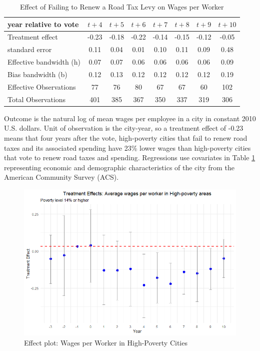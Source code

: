 \begin{table}[ht]
    \centering
    \caption{Effect of Failing to Renew a Road Tax Levy on Wages per Worker}
    \label{tab:wages_per_worker}
    \begin{tabular}{p{2.8cm}ccccccc}
        \hline
        year relative to vote & $t + 4$ & $t + 5$ & $t + 6$ & $t + 7$ & $t + 8$ & $t + 9$ & $t + 10$ \\
        \hline
        Treatment effect & -0.23 & -0.18 & -0.22 & -0.14 & -0.15 & -0.12 & -0.05 \\
        standard error & 0.11 & 0.04 & 0.01 & 0.10 & 0.11 & 0.09 & 0.48 \\
        Effective bandwidth (h) & 0.07 & 0.07 & 0.06 & 0.06 & 0.06 & 0.06 & 0.09 \\
        Bias bandwidth (b) & 0.12 & 0.13 & 0.12 & 0.12 & 0.12 & 0.12 & 0.19 \\
        Effective Observations & 77 & 76 & 80 & 67 & 67 & 60 & 102 \\
        Total Observations & 401 & 385 & 367 & 350 & 337 & 319 & 306 \\
        \hline
    \end{tabular}
    \begin{tablenotes}
        \small 
        \item Outcome is the natural log of mean wages per employee in a city in constant 2010 U.S. dollars. Unit of observation is the city-year, so a treatment effect of -0.23 means that four years after the vote, high-poverty cities that fail to renew road taxes and its associated spending have 23\% lower wages than high-poverty cities that vote to renew road taxes and spending. Regressions use covariates in Table \ref{tab:wages_per_worker} representing economic and demographic characteristics of the city from the American Community Survey (ACS).
    \end{tablenotes}
\end{table}

\begin{figure}[htbp]
    \centering
    \includegraphics[width=\textwidth,keepaspectratio]{images/tes_high_pov_re.png}    
    \caption{Effect plot: Wages per Worker in High-Poverty Cities}
    \label{fig:tes_g_emp_hp}
\end{figure}

